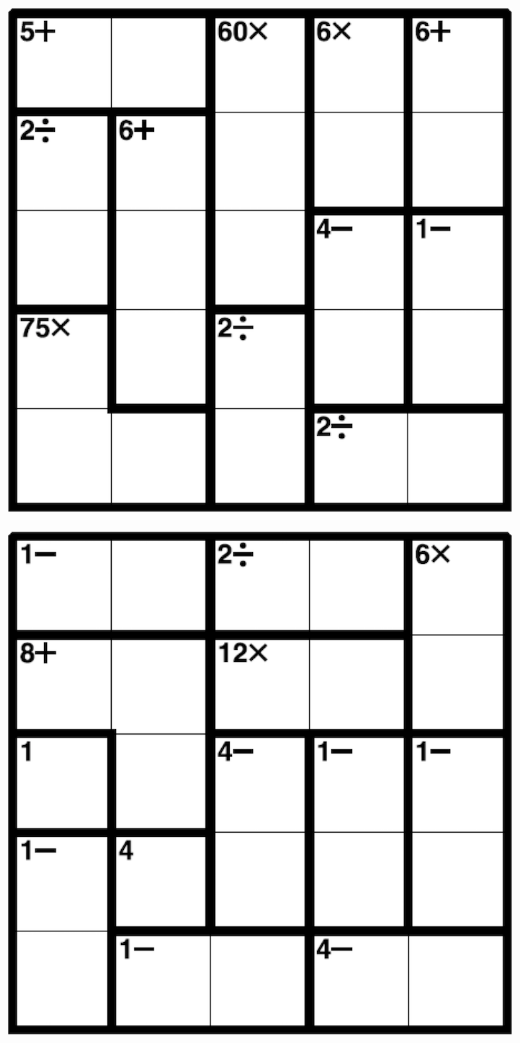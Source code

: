 
\includegraphics[scale=1]{Gambar/Lampiran/5x5_17.png}

\includegraphics[scale=1]{Gambar/Lampiran/5x5_18.png}
